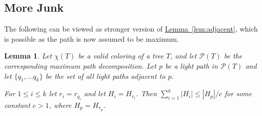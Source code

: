 \documentclass[11pt]{article}
\newtheorem{lemma}[theorem]{Lemma}
\theoremstyle{definition}
\newcommand{\Lem}[1]{\hyperref[lem:#1]{Lemma~\ref*{lem:#1}}} %
\begin{document}
\subsection{More Junk}

The following can be viewed as stronger version of \Lem{adjacent}, which is possible as the path is now assumed to be maximum.

\begin{lemma}
 Let $\chi(T)$ be a valid coloring of a tree $T$, and let $\mathcal{P}(T)$ be the corresponding maximum path decomposition.
 Let $p$ be a light path in $\mathcal{P}(T)$ and let $\{q_1, \dots q_k\}$ be the set of all light paths adjacent to $p$.
 
 For $1\leq i\leq k$ let $r_i = r_{q_i}$ and let $H_i = H_{r_i}$.
  Then $\sum_{i=1}^k |H_i| \leq |H_p|/c$ for some constant $c>1$, where $H_p = H_{r_p}$.
\end{lemma}


% 









\end{document}
